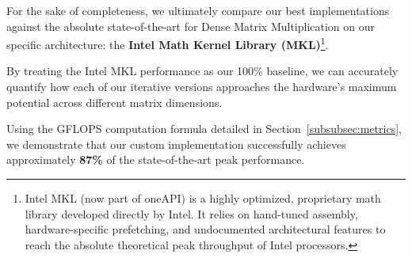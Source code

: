 For the sake of completeness, we ultimately compare our best implementations against the absolute state-of-the-art for Dense Matrix Multiplication on our specific architecture: the \textbf{Intel Math Kernel Library (MKL)}\footnote{Intel MKL (now part of oneAPI) is a highly optimized, proprietary math library developed directly by Intel. It relies on hand-tuned assembly, hardware-specific prefetching, and undocumented architectural features to reach the absolute theoretical peak throughput of Intel processors.}. 



By treating the Intel MKL performance as our 100\% baseline, we can accurately quantify how each of our iterative versions approaches the hardware's maximum potential across different matrix dimensions. 

Using the GFLOPS computation formula detailed in Section~\ref{subsubsec:metrics}, we demonstrate that our custom implementation successfully achieves approximately \textbf{87\%} of the state-of-the-art peak performance.